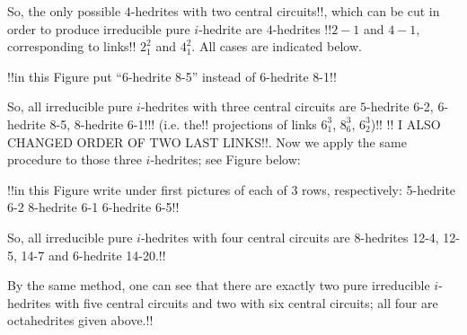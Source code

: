\documentclass[12pt]{article}
\begin{document}
\begin{center}
\epsfxsize=40mm
\end{center}



So, the only possible $4$-hedrites with two central circuits!!, which can be cut in order to produce irreducible pure $i$-hedrite are 
$4$-hedrites !!$2-1$ and $4-1$, corresponding to links!! $2^2_1$ and $4^2_1$. 
All cases are indicated below. 

\begin{center}
\epsfxsize=120mm
\end{center}
!!in this Figure put ``6-hedrite 8-5'' instead of 6-hedrite 8-1!!

So, all irreducible pure $i$-hedrites with three central circuits are $5$-hedrite 6-2, $6$-hedrite 8-5, $8$-hedrite 6-1!!!
(i.e. the!! projections of links $6^3_1$, $8^3_6$, $6^3_2$)!!
!! I ALSO CHANGED ORDER OF TWO LAST LINKS!!.
 Now we apply the same procedure to those three $i$-hedrites; see Figure below:

\begin{center}
\epsfxsize=120mm
\end{center}
!!in this Figure write under first pictures of each of 3 rows,
respectively:
5-hedrite 6-2
8-hedrite 6-1
6-hedrite 6-5!!

So, all irreducible pure $i$-hedrites with four central circuits are $8$-hedrites 12-4, 12-5, 14-7 and $6$-hedrite 14-20.!!

By the same method, one can see that there are exactly two pure irreducible $i$-hedrites with five central circuits and two with six central circuits; all four are octahedrites given above.!!
\end{document}

